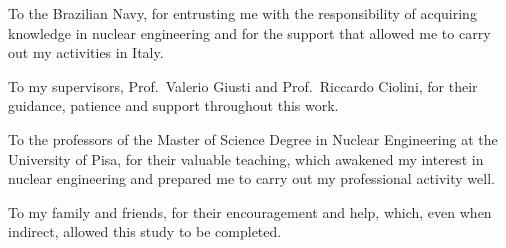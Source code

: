 \documentclass[12pt,twoside,openright]{book}
\begin{document}
To the Brazilian Navy, for entrusting me with the responsibility of
acquiring knowledge in nuclear engineering and for the support that allowed
me to carry out my activities in Italy.

To my supervisors, Prof.~Valerio Giusti and Prof.~Riccardo Ciolini, for
their guidance, patience and support throughout this work.

To the professors of the Master of Science Degree in Nuclear Engineering at
the University of Pisa, for their valuable teaching, which awakened my
interest in nuclear engineering and prepared me to carry out my
professional activity well.

To my family and friends, for their encouragement and help, which, even
when indirect, allowed this study to be completed.

\tableofcontents
\thispagestyle{specialheader}
\markboth{}{}

\listoffigures
\thispagestyle{specialheader}
\markboth{}{}

\listoftables
\thispagestyle{specialheader}
\markboth{}{}

\mainmatter













\begin{appendices}





\end{appendices}

\backmatter
{}


\
\end{document}
